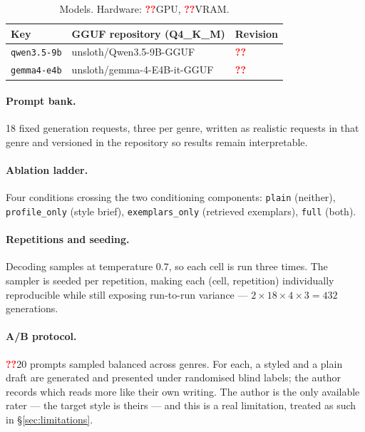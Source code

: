 \documentclass[11pt]{article}
\newcommand{\pending}[1][??]{\textcolor{red}{\textbf{#1}}}
\begin{document}
\begin{table}[t]
\centering\small
\begin{tabular}{@{}lll@{}}
\toprule
Key & GGUF repository (Q4\_K\_M) & Revision \\
\midrule
\texttt{qwen3.5-9b}  & unsloth/Qwen3.5-9B-GGUF               & \pending \\
\texttt{gemma4-e4b}  & unsloth/gemma-4-E4B-it-GGUF           & \pending \\
\bottomrule
\end{tabular}
\caption{Models. Hardware: \pending{GPU}, \pending{VRAM}.}
\label{tab:models}
\end{table}

\paragraph{Prompt bank.} 18 fixed generation requests, three per genre, written
as realistic requests in that genre and versioned in the repository so results
remain interpretable.

\paragraph{Ablation ladder.} Four conditions crossing the two conditioning
components: \texttt{plain} (neither), \texttt{profile\_only} (style brief),
\texttt{exemplars\_only} (retrieved exemplars), \texttt{full} (both).

\paragraph{Repetitions and seeding.} Decoding samples at temperature $0.7$, so
each cell is run three times. The sampler is seeded per repetition, making each
(cell, repetition) individually reproducible while still exposing run-to-run
variance --- $2 \times 18 \times 4 \times 3 = 432$ generations.

\paragraph{A/B protocol.} \pending{20} prompts sampled balanced across genres.
For each, a styled and a plain draft are generated and presented under randomised
blind labels; the author records which reads more like their own writing. The
author is the only available rater --- the target style is theirs --- and this is
a real limitation, treated as such in \S\ref{sec:limitations}.
\end{document}

